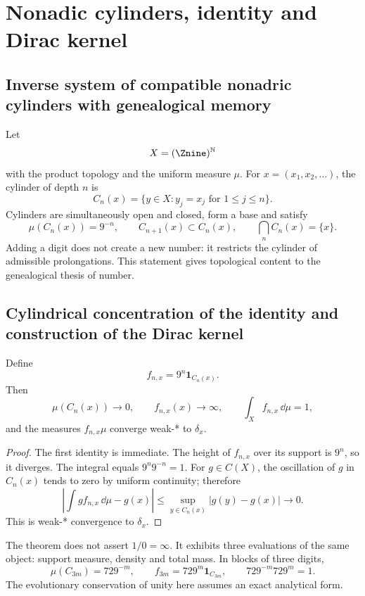 \chapter{Nonadic cylinders, identity and Dirac kernel}

\section{Inverse system of compatible nonadric cylinders with genealogical memory}

Let
\[
X=(\Znine)^{\mathbb N}
\]
with the product topology and the uniform measure \(\mu\). For
\(x=(x_1,x_2,\ldots)\), the cylinder of depth \(n\) is
\[
C_n(x)=\{y\in X:y_j=x_j\text{ for }1\le j\le n\}.
\]
Cylinders are simultaneously open and closed, form a base and
satisfy
\[
\mu(C_n(x))=9^{-n},\qquad
C_{n+1}(x)\subset C_n(x),\qquad
\bigcap_n C_n(x)=\{x\}.
\]
Adding a digit does not create a new number: it restricts the cylinder of
admissible prolongations. This statement gives topological content to the
genealogical thesis of number.

\section{Cylindrical concentration of the identity and construction of the Dirac kernel}

\begin{theorem}
Define
\[
f_{n,x}=9^n\mathbf1_{C_n(x)}.
\]
Then
\[
\mu(C_n(x))\to0,\qquad f_{n,x}(x)\to\infty,\qquad
\int_Xf_{n,x}\,\dd\mu=1,
\]
and the measures \(f_{n,x}\mu\) converge weak-* to \(\delta_x\).
\end{theorem}

\begin{proof}
The first identity is immediate. The height of \(f_{n,x}\) over its support
is \(9^n\), so it diverges. The integral equals
\(9^n9^{-n}=1\). For \(g\in C(X)\), the oscillation of \(g\) in \(C_n(x)\)
tends to zero by uniform continuity; therefore
\[
\left|\int g f_{n,x}\,\dd\mu-g(x)\right|
\le \sup_{y\in C_n(x)}|g(y)-g(x)|\longrightarrow0.
\]
This is weak-* convergence to \(\delta_x\).
\end{proof}

The theorem does not assert \(1/0=\infty\). It exhibits three evaluations of the same
object: support measure, density and total mass. In blocks of three digits,
\[
\mu(C_{3m})=729^{-m},\qquad
f_{3m}=729^m\mathbf1_{C_{3m}},\qquad
729^{-m}729^m=1.
\]
The evolutionary conservation of unity here assumes an exact analytical form.

